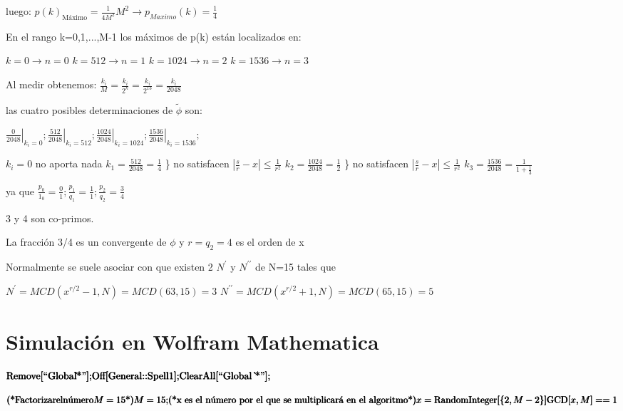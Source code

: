 luego: $p(k)_{\text{Máximo}} = \frac{1}{4M^2} M^2 \rightarrow p_{Maximo}(k) = \frac{1}{4}$

En el rango k=0,1,...,M-1 los máximos de p(k) están localizados en:

$k=0 \rightarrow n=0$
$k=512 \rightarrow n=1$
$k=1024 \rightarrow n=2$
$k=1536 \rightarrow n=3$


Al medir obtenemos: $\frac{k_i}{M} = \frac{k_i}{2^k} = \frac{k_i}{2^{13}} = \frac{k_i}{2048}$

las cuatro posibles determinaciones de $\tilde{\phi}$ son:

$\left. \frac{0}{2048} \right|_{k_i=0}; \left. \frac{512}{2048} \right|_{k_i=512}; \left. \frac{1024}{2048} \right|_{k_i=1024}; \left. \frac{1536}{2048} \right|_{k_i=1536};$

$k_i = 0$ no aporta nada
$k_1 = \frac{512}{2048} = \frac{1}{4}$ \} no satisfacen $|\frac{s}{r} - x| \leq \frac{1}{r^2}$
$k_2 = \frac{1024}{2048} = \frac{1}{2}$ \} no satisfacen $|\frac{s}{r} - x| \leq \frac{1}{r^2}$
$k_3 = \frac{1536}{2048} = \frac{1}{1+\frac{1}{3}}$

ya que $\frac{p_0}{1_0} = \frac{0}{1}; \frac{p_1}{q_1} = \frac{1}{1}; \frac{p_2}{q_2} = \frac{3}{4}$

3 y 4 son co-primos.

La fracción 3/4 es un convergente de $\phi$ y $r = q_2 = 4$ es el orden de x

Normalmente se suele asociar con que existen 2 $N^\prime$ y $N^{\prime\prime}$ de N=15 tales que

$N^\prime = MCD(x^{r/2} - 1, N) = MCD(63, 15) = 3$
$N^{\prime\prime} = MCD(x^{r/2} + 1, N) = MCD(65, 15) = 5$

\section{Simulación en Wolfram Mathematica}

\begin{doublespace}
\noindent\(\pmb{\text{Remove}[\text{{``}Global$\grave{ }$*{''}}];}\\
\pmb{\text{Off}[\text{General}\text{::}\text{Spell1}];}\\
\pmb{\text{ClearAll}[\text{{``}Global $\grave{ }$*{''}}];}\)
\end{doublespace}

\begin{doublespace}
\noindent\(\pmb{\text{(*}\text{Factorizar} \text{el} \text{n{\' u}mero} M=15\text{*)}}\\
\pmb{M=15;}\\
\pmb{\text{(*x es el n{\' u}mero por el que se multiplicar{\' a} en el algoritmo*)}}\\
\pmb{x=\text{RandomInteger}[\{2,M-2\}]}\\
\pmb{\text{GCD}[x,M]==1}\)
\end{doublespace}

